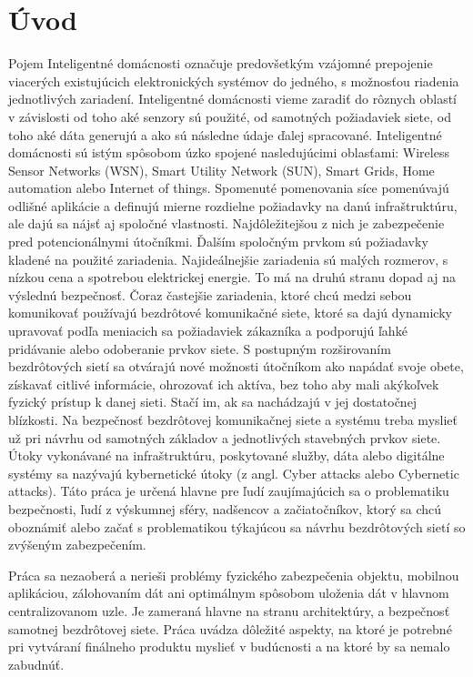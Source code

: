 \documentclass[12pt,a4paper,oneside,openright]{report}
\begin{document}

\newpage 
{}
\setcounter{page}{1}


\chapter{Úvod}
Pojem Inteligentné domácnosti označuje predovšetkým vzájomné prepojenie viacerých existujúcich elektronických systémov do jedného, s možnosťou riadenia jednotlivých zariadení.
Inteligentné domácnosti vieme zaradiť do rôznych oblastí v závislosti od toho aké senzory sú použité, od samotných požiadaviek siete, od toho aké dáta generujú a ako sú následne údaje ďalej spracované. Inteligentné domácnosti sú istým spôsobom úzko spojené nasledujúcimi oblasťami: Wireless Sensor Networks (WSN), Smart Utility Network (SUN), Smart Grids, Home automation alebo Internet of things. Spomenuté pomenovania síce pomenúvajú odlišné aplikácie a definujú mierne rozdielne požiadavky na danú infraštruktúru, ale dajú sa nájsť aj spoločné vlastnosti. Najdôležitejšou z nich je zabezpečenie pred potencionálnymi útočníkmi.
Ďalším spoločným prvkom sú požiadavky kladené na použité zariadenia. Najideálnejšie zariadenia sú malých rozmerov, s nízkou cena a spotrebou elektrickej energie. To má na druhú stranu dopad aj na výslednú bezpečnosť.
Čoraz častejšie zariadenia, ktoré chcú medzi sebou komunikovať používajú bezdrôtové komunikačné siete, ktoré sa dajú dynamicky upravovať podľa meniacich sa požiadaviek zákazníka a podporujú ľahké pridávanie alebo odoberanie prvkov siete.
S postupným rozširovaním bezdrôtových sietí sa otvárajú nové možnosti útočníkom ako napádať svoje obete, získavať citlivé informácie, ohrozovať ich aktíva, bez toho aby mali akýkoľvek fyzický prístup k danej sieti. Stačí im, ak sa nachádzajú v jej dostatočnej blízkosti.
Na bezpečnosť bezdrôtovej komunikačnej siete a systému treba myslieť už pri návrhu od samotných základov a jednotlivých stavebných prvkov siete.
Útoky vykonávané na infraštruktúru, poskytované služby, dáta alebo digitálne systémy sa nazývajú kybernetické útoky (z angl. Cyber attacks alebo Cybernetic attacks).
Táto práca je určená hlavne pre ľudí zaujímajúcich sa o problematiku bezpečnosti, ľudí z výskumnej sféry, nadšencov a začiatočníkov, ktorý sa chcú oboznámiť alebo začať s problematikou týkajúcou sa návrhu bezdrôtových sietí so zvýšeným zabezpečením.

Práca sa nezaoberá a nerieši problémy fyzického zabezpečenia objektu, mobilnou aplikáciou, zálohovaním dát ani optimálnym spôsobom uloženia dát v hlavnom centralizovanom uzle. Je zameraná hlavne na stranu architektúry, a bezpečnosť samotnej bezdrôtovej siete. Práca uvádza dôležité aspekty, na ktoré je potrebné pri vytváraní finálneho produktu myslieť v budúcnosti a na ktoré by sa nemalo zabudnúť.
\end{document}
